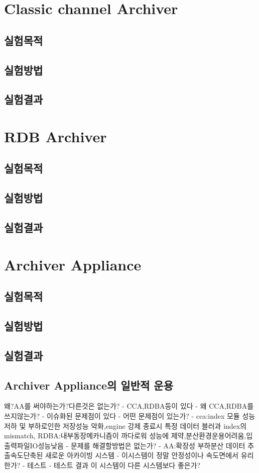 \documentclass[11pt
  , a4paper
  , article
  , oneside
]{memoir}
\begin{document}
\section{Classic channel Archiver}
\subsection{실험목적}
\subsection{실험방법}
\subsection{실험결과}
\section{RDB Archiver}
\subsection{실험목적}
\subsection{실험방법}
\subsection{실험결과}
\section{Archiver Appliance}
\subsection{실험목적}
\subsection{실험방법}
\subsection{실험결과}
\subsection{Archiver Appliance의 일반적 운용}
왜?AA를 써야하는가?다른것은 없는가? - CCA,RDBA등이 있다 - 왜 CCA,RDBA를 쓰지않는가? - 이슈화된 문제점이 있다 - 어떤 문제점이 있는가? - cca:index 모듈 성능저하 및 부하로인한 저장성능 악화,engine 강제 종료시 특정 데이터 블러과 index의 mismatch, RDBA:내부동장메카니즘이 까다로워 성능에 제약,분산환경운용어려움,입출력파일IO성능낮음 - 문제를 해결할방법은 없는가? - AA:확장성 부하분산 데이터 추출속도단축된 새로운 아카이빙 시스템 - 이시스템이 정말 안정성이나 속도면에서 유리한가? - 테스트 - 테스트 결과 이 시스템이 다른 시스템보다 좋은가? \\
\end{document}

